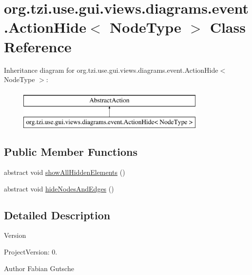 \hypertarget{classorg_1_1tzi_1_1use_1_1gui_1_1views_1_1diagrams_1_1event_1_1_action_hide_3_01_node_type_01_4}{\section{org.\-tzi.\-use.\-gui.\-views.\-diagrams.\-event.\-Action\-Hide$<$ Node\-Type $>$ Class Reference}
\label{classorg_1_1tzi_1_1use_1_1gui_1_1views_1_1diagrams_1_1event_1_1_action_hide_3_01_node_type_01_4}
}
Inheritance diagram for org.\-tzi.\-use.\-gui.\-views.\-diagrams.\-event.\-Action\-Hide$<$ Node\-Type $>$\-:\begin{figure}[H]
\begin{center}
\leavevmode
\includegraphics[height=2.000000cm]{classorg_1_1tzi_1_1use_1_1gui_1_1views_1_1diagrams_1_1event_1_1_action_hide_3_01_node_type_01_4}
\end{center}
\end{figure}
\subsection*{Public Member Functions}
\begin{DoxyCompactItemize}
\item 
abstract void \hyperlink{classorg_1_1tzi_1_1use_1_1gui_1_1views_1_1diagrams_1_1event_1_1_action_hide_3_01_node_type_01_4_aa5d07c6d74cbe706cd968564e23999ee}{show\-All\-Hidden\-Elements} ()
\item 
abstract void \hyperlink{classorg_1_1tzi_1_1use_1_1gui_1_1views_1_1diagrams_1_1event_1_1_action_hide_3_01_node_type_01_4_aef86e473258baa0abcd58434922d136b}{hide\-Nodes\-And\-Edges} ()
\end{DoxyCompactItemize}


\subsection{Detailed Description}
\begin{DoxyVersion}{Version}

\end{DoxyVersion}
\begin{DoxyParagraph}{Project\-Version\-:}
0. 
\end{DoxyParagraph}
\begin{DoxyAuthor}{Author}
Fabian Gutsche 
\end{DoxyAuthor}


